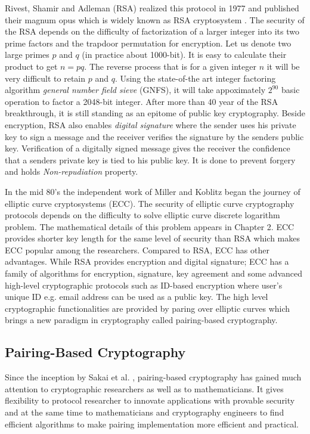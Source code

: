 Rivest, Shamir and Adleman (RSA) realized this protocol in 1977 and published their magnum opus which is widely known as RSA cryptosystem \cite{rivest1978method}. 
The security of the RSA depends on the difficulty of factorization of a larger integer into its two prime factors and the trapdoor permutation for encryption.
Let us denote  two large primes $p$ and $q$ (in practice about 1000-bit).
It is easy to calculate their product to get $n = pq$.
The reverse process that is for a given integer $n$ it will be very difficult to retain $p$ and $q$.
Using the state-of-the art integer factoring algorithm \textit{general number field sieve }(GNFS), it will take appoximately $2^{90}$ basic operation to factor a 2048-bit integer.
After more than 40 year of the RSA breakthrough, it is still standing as an epitome of public key cryptography.
Beside encryption, RSA also enables \textit{digital signature }where the sender uses his private key to sign a message and the receiver verifies the signature by the senders public key. 
Verification of a digitally signed message gives the receiver the confidence that a senders private key is tied to his public key.
It is done to prevent forgery and holds \textit{Non-repudiation} property.

In the mid 80's the independent work of Miller \cite{C:Miller85} and Koblitz \cite{koblitz1987elliptic} began the journey of elliptic curve cryptosystems (ECC). 
The security of  elliptic curve cryptography  protocols depends on the difficulty to solve elliptic curve discrete logarithm problem.
The mathematical details of this problem appears in Chapter 2. %
ECC provides shorter key length for the same level of security than RSA which makes ECC  popular among the researchers. 
Compared to RSA, ECC has other advantages. 
While RSA provides encryption and digital signature; ECC has a family of algorithms for encryption, signature, key agreement and some advanced high-level cryptographic protocols such as ID-based encryption \cite{AC:BonLynSha01} where user's unique ID e.g. email address can be used as a public key. 
The high level cryptographic functionalities are provided by paring over elliptic curves \cite{TODO} which brings a new paradigm in cryptography called pairing-based cryptography.

\subsection{Pairing-Based Cryptography}
\label{ch1_subsec_pbc}
Since the inception by Sakai et al. \cite{sakai2000cryptosystems}, pairing-based cryptography has gained much attention to cryptographic researchers as well as  to mathematicians. It gives flexibility to protocol researcher to innovate applications with provable security and at the same time to mathematicians and cryptography engineers to find efficient algorithms to make pairing implementation more efficient and practical.

